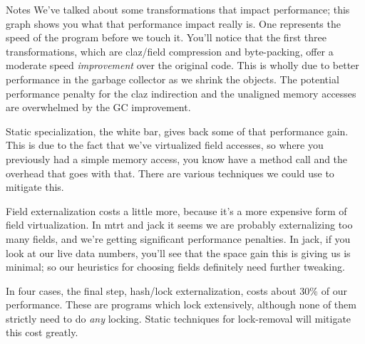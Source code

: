 \documentclass[%
pdf,
colorBG,
slideColor,
nototal,
oqe
]{prosper}
\newenvironment{talknotes}{\begin{slide}{Notes}\tiny}{\end{slide}}
\begin{document}
\begin{talknotes}
We've talked about some transformations that impact performance;
this graph shows you what that performance impact really is.
One represents the speed of the program before we touch it.
You'll notice that the first three transformations, which are
claz/field compression and byte-packing, offer a moderate speed
\emph{improvement} over the original code.  This is wholly due to
better performance in the garbage collector as we shrink the
objects.  The potential performance penalty for the claz indirection
and the unaligned memory accesses are overwhelmed by the GC
improvement.

Static specialization, the white bar, gives back some of that
performance gain.  This is due to the fact that we've virtualized
field accesses, so where you previously had a simple memory access,
you know have a method call and the overhead that goes with that.
There are various techniques we could use to mitigate this.

Field externalization costs a little more, because it's a more
expensive form of field virtualization.  In mtrt and jack it seems we
are probably externalizing too many fields, and we're getting
significant performance penalties.  In jack, if you look at our live
data numbers, you'll see that the space gain this is giving us is
minimal; so our heuristics for choosing fields definitely need further
tweaking.

In four cases, the final step, hash/lock externalization, costs about
30\% of our performance.  These are programs which lock extensively,
although none of them strictly need to do \emph{any} locking.
Static techniques for lock-removal will mitigate this cost greatly.

~%
\end{talknotes}
\end{document}
